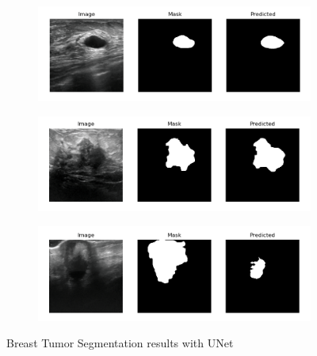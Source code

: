 \newpage
\begin{figure}[]
    \centering
    \begin{subfigure}{1\textwidth}
        \centering
        \includegraphics[width=\linewidth]{images/results/BUSI-unet7.png}
        \subcaption{}
        \label{fig:busi-unet1}
    \end{subfigure}    
    \vspace{1em}      
    \begin{subfigure}{1\textwidth}
        \centering
        \includegraphics[width=\linewidth]{images/results/BUSI-unet6.png}
        \subcaption{}
        \label{fig:busi-unet2}
    \end{subfigure}
    \vspace{1em}
        \begin{subfigure}{1\textwidth}
        \centering
        \includegraphics[width=\linewidth]{images/results/BUSI-unet1.png}
        \subcaption{}
        \label{fig:busi-unet3}
    \end{subfigure}
    \caption{Breast Tumor Segmentation results with UNet}
    \label{fig:busi-unet}
\end{figure}

